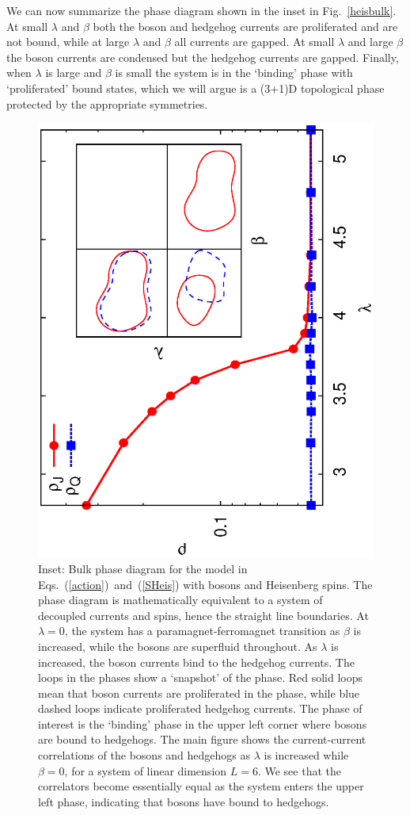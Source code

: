 \documentclass[prb,twocolumn]{revtex4-1}
\begin{document}
We can now summarize the phase diagram shown in the inset in Fig.~\ref{heisbulk}. At small $\lambda$ and $\beta$ both the boson and hedgehog currents are proliferated and are not bound, while at large $\lambda$ and $\beta$ all currents are gapped. At small $\lambda$ and large $\beta$ the boson currents are condensed but the hedgehog currents are gapped. Finally, when $\lambda$ is large and $\beta$ is small the system is in the `binding' phase with `proliferated' bound states, which we will argue is a (3+1)D topological phase protected by the appropriate symmetries.


\begin{figure}
\includegraphics[angle=-90,width=\linewidth]{figures/heisbulkout.eps}
\caption{Inset: Bulk phase diagram for the model in Eqs.~(\ref{action})~and~(\ref{SHeis}) with bosons and Heisenberg spins. The phase diagram is mathematically equivalent to a system of decoupled currents and spins, hence the straight line boundaries. At $\lambda=0$, the system has a paramagnet-ferromagnet transition as $\beta$ is increased, while the bosons are superfluid throughout. As $\lambda$ is increased, the boson currents bind to the hedgehog currents. The loops in the phases show a `snapshot' of the phase. Red solid loops mean that boson currents are proliferated in the phase, while blue dashed loops indicate proliferated hedgehog currents. The phase of interest is the `binding' phase in the upper left corner where bosons are bound to hedgehogs. The main figure shows the current-current correlations of the bosons and hedgehogs as $\lambda$ is increased while $\beta=0$, for a system of linear dimension $L=6$. We see that the correlators become essentially equal as the system enters the upper left phase, indicating that bosons have bound to hedgehogs.}

\end{figure}
\end{document}
